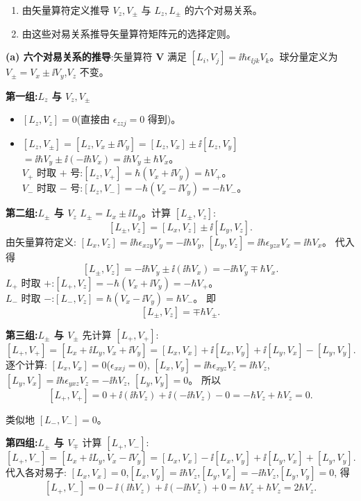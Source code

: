 \begin{question}
\begin{enumerate}
\item 由矢量算符定义推导 $V_z,V_\pm$ 与 $L_z,L_\pm$ 的六个对易关系。
\item 由这些对易关系推导矢量算符矩阵元的选择定则。
\end{enumerate}
\end{question}
\begin{solution}
	\textbf{(a) 六个对易关系的推导}:矢量算符 $\mathbf V$ 满足 $[L_i,V_j]=\ii\hbar\epsilon_{\ii jk}V_k$。球分量定义为 $V_\pm=V_x\pm\ii V_y$,$V_z$ 不变。

	\textbf{第一组:$L_z$ 与 $V_z,V_\pm$}
	\begin{itemize}
	\item $[L_z,V_z]=0$(直接由 $\epsilon_{zzj}=0$ 得到)。
	\item $[L_z,V_\pm] = [L_z,V_x\pm\ii V_y] = [L_z,V_x]\pm\ii[L_z,V_y]$\\
	$= \ii\hbar V_y \pm\ii(-\ii\hbar V_x) = \ii\hbar V_y\pm\hbar V_x$。\\
	$V_+$ 时取 $+$ 号:$[L_z,V_+]=\hbar(V_x+\ii V_y)=\hbar V_+$。\\
	$V_-$ 时取 $-$ 号:$[L_z,V_-]=-\hbar(V_x-\ii V_y)=-\hbar V_-$。
	\end{itemize}

	\textbf{第二组:$L_\pm$ 与 $V_z$}
	$L_\pm = L_x\pm\ii L_y$。计算 $[L_\pm,V_z]$:
	\[
	[L_\pm,V_z] = [L_x,V_z]\pm\ii[L_y,V_z].
	\]
	由矢量算符定义:
	$[L_x,V_z]=\ii\hbar\epsilon_{xzy}V_y = -\ii\hbar V_y$,
	$[L_y,V_z]=\ii\hbar\epsilon_{yzx}V_x = \ii\hbar V_x$。
	代入得
	\[
	[L_\pm,V_z] = -\ii\hbar V_y \pm\ii(\ii\hbar V_x) = -\ii\hbar V_y \mp\hbar V_x.
	\]
	$L_+$ 时取 $+$:$[L_+,V_z] = -\hbar(V_x+\ii V_y) = -\hbar V_+$。\\
	$L_-$ 时取 $-$:$[L_-,V_z] = \hbar(V_x-\ii V_y) = \hbar V_-$。
	即
	\[
	[L_\pm,V_z] = \mp\hbar V_\pm.
	\]

	\textbf{第三组:$L_\pm$ 与 $V_\pm$} 先计算 $[L_+,V_+]$:
	\[
	[L_+,V_+] = [L_x+\ii L_y, V_x+\ii V_y]
	= [L_x,V_x] + \ii[L_x,V_y] + \ii[L_y,V_x] - [L_y,V_y].
	\]
	逐个计算:
	$[L_x,V_x]=0$($\epsilon_{xxj}=0$),
	$[L_x,V_y]=\ii\hbar\epsilon_{xyz}V_z = \ii\hbar V_z$,
	$[L_y,V_x]=\ii\hbar\epsilon_{yxz}V_z = -\ii\hbar V_z$,
	$[L_y,V_y]=0$。
	所以
	\[
	[L_+,V_+] = 0 + \ii(\ii\hbar V_z) + \ii(-\ii\hbar V_z) - 0 = -\hbar V_z + \hbar V_z = 0.
	\]

	类似地 $[L_-,V_-]=0$。

	\textbf{第四组:$L_\pm$ 与 $V_\mp$} 计算 $[L_+,V_-]$:
	\[
	[L_+,V_-] = [L_x+\ii L_y, V_x-\ii V_y]
	= [L_x,V_x] -\ii[L_x,V_y] +\ii[L_y,V_x] + [L_y,V_y].
	\]
	代入各对易子:
	$[L_x,V_x]=0$,$[L_x,V_y]=\ii\hbar V_z$,$[L_y,V_x]=-\ii\hbar V_z$,$[L_y,V_y]=0$,
	得
	\[
	[L_+,V_-] = 0 - \ii(\ii\hbar V_z) + \ii(-\ii\hbar V_z) + 0 = \hbar V_z + \hbar V_z = 2\hbar V_z.
	\]


\end{solution}
